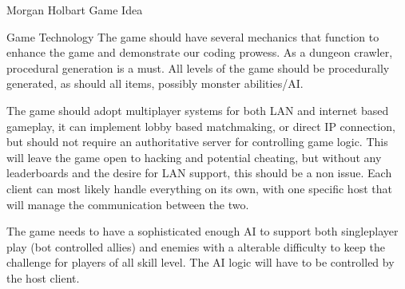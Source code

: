 \documentclass[12pt]{report}
\begin{document}
\begin{section}{Morgan Holbart Game Idea}
\begin{subsection}{Game Technology}
The game should have several mechanics that function to enhance the game and demonstrate our coding prowess. As
a dungeon crawler, procedural generation is a must. All levels of the game should be procedurally generated, as
should all items, possibly monster abilities/AI.

The game should adopt multiplayer systems for both LAN and internet based gameplay, it can implement lobby based
matchmaking, or direct IP connection, but should not require an authoritative server for controlling game logic. 
This will leave the game open to hacking and potential cheating, but without any leaderboards and the desire for
LAN support, this should be a non issue. Each client can most likely handle everything on its own, with one specific
host that will manage the communication between the two.

The game needs to have a sophisticated enough AI to support both singleplayer play (bot controlled allies) and enemies
with a alterable difficulty to keep the challenge for players of all skill level. The AI logic will have to be 
controlled by the host client.
\end{subsection}
\end{section}
\end{document}
